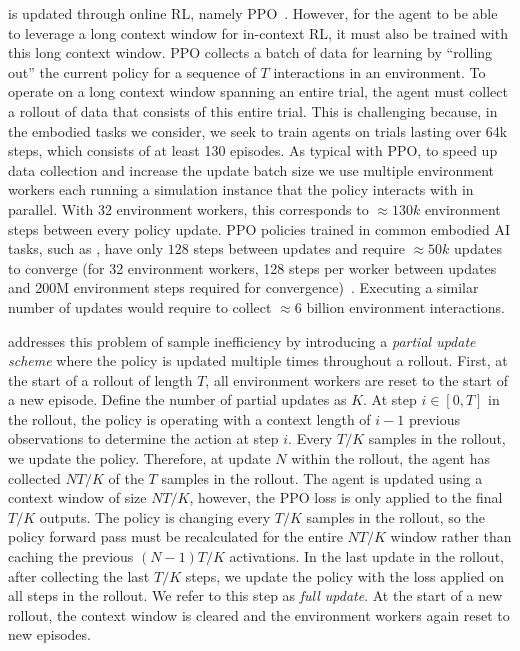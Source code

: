 \method is updated through online RL, namely PPO~\citep{schulman2017proximal}.
However, for the agent to be able to leverage a long context window for in-context RL, it must also be trained with this long context window.
PPO collects a batch of data for learning by ``rolling out'' the current policy for a sequence of $ T$ interactions in an environment. 
To operate on a long context window spanning an entire trial, the agent must collect a rollout of data that consists of this entire trial.
This is challenging because, in the embodied tasks we consider, we seek to train agents on trials lasting over 64k steps, which consists of at least 130 episodes.  
As typical with PPO, to speed up data collection and increase the update batch size we use multiple environment workers each running a simulation instance that the policy interacts with in parallel. 
With 32 environment workers, this corresponds to $ \approx 130k$ environment steps between every policy update.
PPO policies trained in common embodied AI tasks, such as \obnav, have only $128$ steps between updates and require $ \approx 50k$ updates to converge (for 32 environment workers, 128 steps per worker between updates and 200M environment steps required for convergence)~\citep{yadav2022ovrl}. Executing a similar number of updates would require \method to collect $ \approx 6 $ billion environment interactions. 


\method addresses this problem of sample inefficiency by introducing a \emph{partial update scheme} where the policy is updated multiple times throughout a rollout.
First, at the start of a rollout of length $ T$, all environment workers are reset to the start of a new episode.
Define the number of partial updates as $ K$. 
At step $ i \in  [0, T] $ in the rollout, the policy is operating with a context length of $ i-1$ previous observations to determine the action at step $ i$. 
Every $ T/K$ samples in the rollout, we update the policy.
Therefore, at update $ N$ within the rollout, the agent has collected $ NT/K$ of the $ T$ samples in the rollout. 
The agent is updated using a context window of size $ NT/K$, however, the PPO loss is only applied to the final $ T/K$ outputs.
The policy is changing every $ T/K$ samples in the rollout, so the policy forward pass must be recalculated for the entire $ NT/K$ window rather than caching the previous $ (N-1)T/K$ activations. 
In the last update in the rollout, after collecting the last $T/K$ steps, we update the policy with the loss applied on all steps in the rollout. We refer to this step as \textit{full update}.
At the start of a new rollout, the context window is cleared and the environment workers again reset to new episodes.

